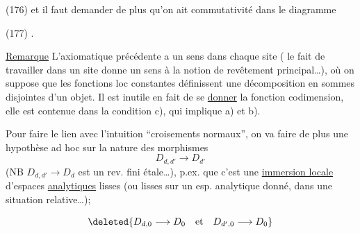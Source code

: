 (176)\quad
{}
et il faut demander de plus qu'on ait commutativité dans le  diagramme

(177)\quad
{}.

\uline{Remarque} L'axiomatique précédente a un sens dans chaque site ( le fait de travailler dans un site donne un sens à la notion de revêtement principal\ldots), où on suppose que les fonctions loc constantes définissent une décomposition en sommes disjointes d'un objet. Il est inutile en fait de se \uline{donner} la fonction codimension, elle est contenue dans la condition c), qui implique a) et b).

Pour faire le lien avec l'intuition ``croisements normaux'', on va faire de plus une hypothèse ad hoc sur la nature des morphismes
\[
D_{d,d'}\longrightarrow D_{d'}
\]
(NB $D_{d,d'}\longrightarrow D_d$ est un rev. fini étale\ldots), p.ex.
que c'est une \uline{immersion locale} d'espaces \uline{analytiques} lisses (ou lisses sur un esp. analytique donné, dans une situation relative\ldots);

\[
\deleted{D_{d,0}\longrightarrow D_0\quad\text{et}\quad D_{d',0}\longrightarrow D_0}
\]

